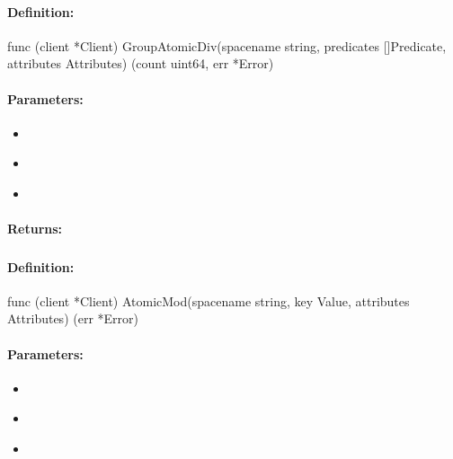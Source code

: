 \paragraph{Definition:}
\begin{gocode}
func (client *Client) GroupAtomicDiv(spacename string, predicates []Predicate, attributes Attributes) (count uint64, err *Error)
\end{gocode}

\paragraph{Parameters:}
\begin{itemize}[noitemsep]
\item {}\\

\item {}\\

\item {}\\

\end{itemize}

\paragraph{Returns:}


\pagebreak
\subsubsection{}
\label{api:Go:AtomicMod}


\paragraph{Definition:}
\begin{gocode}
func (client *Client) AtomicMod(spacename string, key Value, attributes Attributes) (err *Error)
\end{gocode}

\paragraph{Parameters:}
\begin{itemize}[noitemsep]
\item {}\\

\item {}\\

\item {}\\

\end{itemize}

